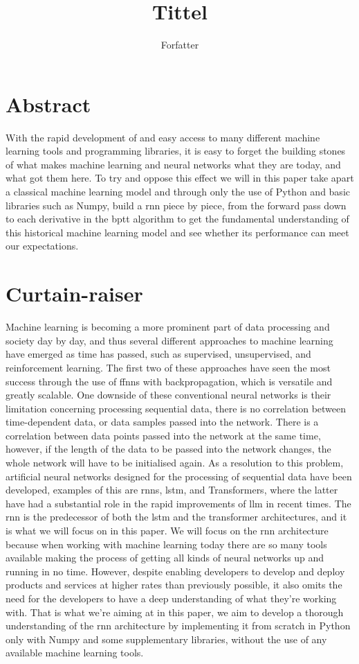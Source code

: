 \documentclass[12pt]{article}
\title{Tittel}
\author{Forfatter}
\date{}
\begin{document}
\maketitle

\section{Abstract}

With the rapid development of and easy access to many different machine learning tools and programming libraries, it is easy to forget the building stones of what makes machine learning and neural networks what they are today, and what got them here. To try and oppose this effect we will in this paper take apart a classical machine learning model and through only the use of Python and basic libraries such as Numpy, build a \gls{rnn} piece by piece, from the forward pass down to each derivative in the \gls{bptt} algorithm to get the fundamental understanding of this historical machine learning model and see whether its performance can meet our expectations.

\section{Curtain-raiser}

Machine learning is becoming a more prominent part of data processing and society day by day, and thus several different approaches to machine learning have emerged as time has passed, such as supervised, unsupervised, and reinforcement learning. The first two of these approaches have seen the most success through the use of \gls{ffnn}s with backpropagation, which is versatile and greatly scalable. One downside of these conventional neural networks is their limitation concerning processing sequential data, there is no correlation between time-dependent data, or data samples passed into the network. There is a correlation between data points passed into the network at the same time, however, if the length of the data to be passed into the network changes, the whole network will have to be initialised again. As a resolution to this problem, artificial neural networks designed for the processing of sequential data have been developed, examples of this are \gls{rnn}s, \gls{lstm}, and Transformers, where the latter have had a substantial role in the rapid improvements of \gls{llm} in recent times. The \gls{rnn} is the predecessor of both the \gls{lstm} and the transformer architectures, and it is what we will focus on in this paper. We will focus on the \gls{rnn} architecture because when working with machine learning today there are so many tools available making the process of getting all kinds of neural networks up and running in no time. However, despite enabling developers to develop and deploy products and services at higher rates than previously possible, it also omits the need for the developers to have a deep understanding of what they're working with. That is what we're aiming at in this paper, we aim to develop a thorough understanding of the \gls{rnn} architecture by implementing it from scratch in Python only with Numpy \cite{Numpy} and some supplementary libraries, without the use of any available machine learning tools.
\end{document}
